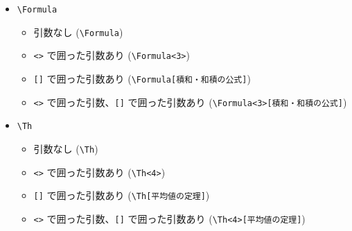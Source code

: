 \documentclass[oneside,10pt,a4paper]{jsarticle}
\begin{document}
\begin{itemize}
\begin{itemize}
\begin{quote}
            \Def[虚数]
          \end{quote}
        \item \verb|<>| で囲った引数、\verb|[]| で囲った引数あり (\verb|\Def<2>[虚数]|)
          \begin{quote}
          \end{quote}
      \end{itemize}
    \newpage
    \item \verb|\Formula|
      \begin{itemize}
        \item 引数なし (\verb|\Formula|)
          \begin{quote}
            \Formula
          \end{quote}
        \item \verb|<>| で囲った引数あり (\verb|\Formula<3>|)
          \begin{quote}
          \end{quote}
        \item \verb|[]| で囲った引数あり (\verb|\Formula[積和・和積の公式]|)
          \begin{quote}
            \Formula[積和・和積の公式]
          \end{quote}
        \item \verb|<>| で囲った引数、\verb|[]| で囲った引数あり (\verb|\Formula<3>[積和・和積の公式]|)
          \begin{quote}
          \end{quote}
      \end{itemize}
    \item \verb|\Th|
      \begin{itemize}
        \item 引数なし (\verb|\Th|)
          \begin{quote}
            \Th
          \end{quote}
        \item \verb|<>| で囲った引数あり (\verb|\Th<4>|)
          \begin{quote}
          \end{quote}
        \item \verb|[]| で囲った引数あり (\verb|\Th[平均値の定理]|)
          \begin{quote}
            \Th[平均値の定理]
          \end{quote}
        \item \verb|<>| で囲った引数、\verb|[]| で囲った引数あり (\verb|\Th<4>[平均値の定理]|)
          \begin{quote}
          \end{quote}
      \end{itemize}
  \end{itemize}
\end{document}
